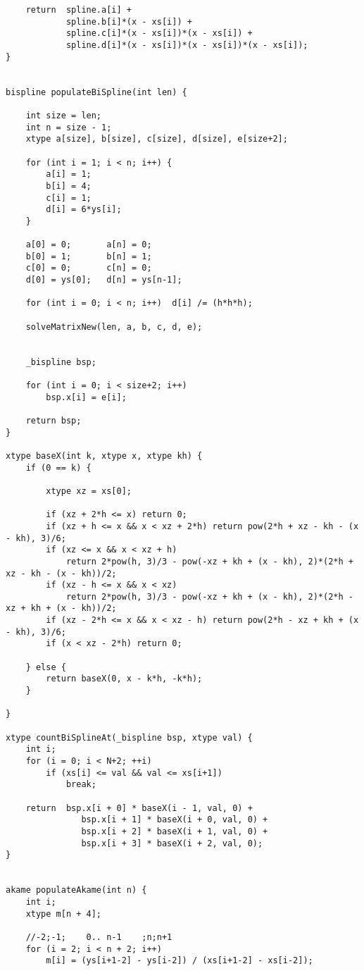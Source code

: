 \documentclass[12pt]{article}
\begin{document}
{\begin{lstlisting}
    return  spline.a[i] +
            spline.b[i]*(x - xs[i]) +
            spline.c[i]*(x - xs[i])*(x - xs[i]) +
            spline.d[i]*(x - xs[i])*(x - xs[i])*(x - xs[i]);
}


bispline populateBiSpline(int len) {

    int size = len;
    int n = size - 1;
    xtype a[size], b[size], c[size], d[size], e[size+2];

    for (int i = 1; i < n; i++) {
        a[i] = 1;
        b[i] = 4;
        c[i] = 1;
        d[i] = 6*ys[i];
    }

    a[0] = 0;		a[n] = 0;
    b[0] = 1;		b[n] = 1;
    c[0] = 0;		c[n] = 0;
    d[0] = ys[0];	d[n] = ys[n-1];

    for (int i = 0; i < n; i++)  d[i] /= (h*h*h);

    solveMatrixNew(len, a, b, c, d, e);


    _bispline bsp;

    for (int i = 0; i < size+2; i++)
        bsp.x[i] = e[i];

    return bsp;
}

xtype baseX(int k, xtype x, xtype kh) {
    if (0 == k) {

        xtype xz = xs[0];

        if (xz + 2*h <= x) return 0;
        if (xz + h <= x && x < xz + 2*h) return pow(2*h + xz - kh - (x - kh), 3)/6;
        if (xz <= x && x < xz + h)
            return 2*pow(h, 3)/3 - pow(-xz + kh + (x - kh), 2)*(2*h + xz - kh - (x - kh))/2;
        if (xz - h <= x && x < xz)
            return 2*pow(h, 3)/3 - pow(-xz + kh + (x - kh), 2)*(2*h - xz + kh + (x - kh))/2;
        if (xz - 2*h <= x && x < xz - h) return pow(2*h - xz + kh + (x - kh), 3)/6;
        if (x < xz - 2*h) return 0;

    } else {
        return baseX(0, x - k*h, -k*h);
    }

}

xtype countBiSplineAt(_bispline bsp, xtype val) {
    int i;
    for (i = 0; i < N+2; ++i)
        if (xs[i] <= val && val <= xs[i+1])
            break;

    return  bsp.x[i + 0] * baseX(i - 1, val, 0) +
               bsp.x[i + 1] * baseX(i + 0, val, 0) +
               bsp.x[i + 2] * baseX(i + 1, val, 0) +
               bsp.x[i + 3] * baseX(i + 2, val, 0);
}


akame populateAkame(int n) {
    int i;
    xtype m[n + 4];
    
    //-2;-1;    0.. n-1    ;n;n+1
    for (i = 2; i < n + 2; i++) 
        m[i] = (ys[i+1-2] - ys[i-2]) / (xs[i+1-2] - xs[i-2]);


\end{lstlisting}}
\end{document}
